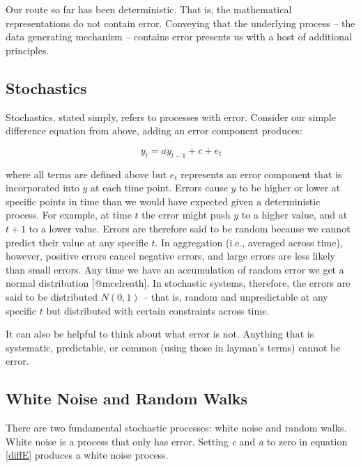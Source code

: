 \documentclass[]{article}
\begin{document}
Our route so far has been deterministic. That is, the mathematical
representations do not contain error. Conveying that the underlying
process -- the data generating mechanism -- contains error presents us
with a host of additional principles.

\hypertarget{stochastics}{%
\subsection{Stochastics}\label{stochastics}}

Stochastics, stated simply, refers to processes with error. Consider our
simple difference equation from above, adding an error component
produces:

\begin{equation}
\label{diffE}
y_{t} = a y_{t-1} + c + e_{t}
\end{equation}

\noindent where all terms are defined above but \(e_{t}\) represents an
error component that is incorporated into \(y\) at each time point.
Errors cause \(y\) to be higher or lower at specific points in time than
we would have expected given a deterministic process. For example, at
time \(t\) the error might push \(y\) to a higher value, and at
\(t + 1\) to a lower value. Errors are therefore said to be random
because we cannot predict their value at any specific \(t\). In
aggregation (i.e., averaged across time), however, positive errors
cancel negative errors, and large errors are less likely than small
errors. Any time we have an accumulation of random error we get a normal
distribution {[}@mcelreath{]}. In stochastic systems, therefore, the
errors are said to be distributed \(N(0, 1)\) -- that is, random and
unpredictable at any specific \(t\) but distributed with certain
constraints across time.

It can also be helpful to think about what error is not. Anything that
is systematic, predictable, or common (using those in layman's terms)
cannot be error.

\hypertarget{white-noise-and-random-walks}{%
\subsection{White Noise and Random
Walks}\label{white-noise-and-random-walks}}

There are two fundamental stochastic processes: white noise and random
walks. White noise is a process that only has error. Setting \emph{c}
and \emph{a} to zero in equation \ref{diffE} produces a white noise
process.
\end{document}
